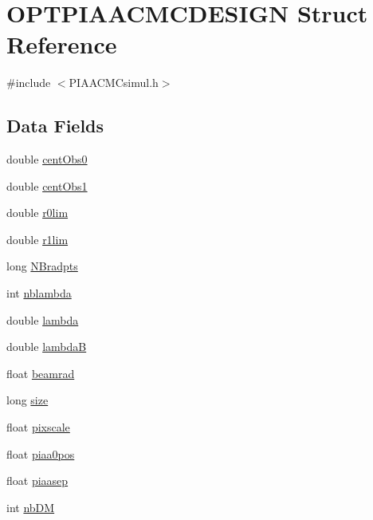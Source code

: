 \hypertarget{structOPTPIAACMCDESIGN}{\section{O\+P\+T\+P\+I\+A\+A\+C\+M\+C\+D\+E\+S\+I\+G\+N Struct Reference}
\label{structOPTPIAACMCDESIGN}
}


{\ttfamily \#include $<$P\+I\+A\+A\+C\+M\+Csimul.\+h$>$}

\subsection*{Data Fields}
\begin{DoxyCompactItemize}
\item 
double \hyperlink{structOPTPIAACMCDESIGN_ad8031116439ad3b191f5fb6e6cfe0070}{cent\+Obs0}
\item 
double \hyperlink{structOPTPIAACMCDESIGN_a4d8d03c42ff2aec6c5b974d80d086a5e}{cent\+Obs1}
\item 
double \hyperlink{structOPTPIAACMCDESIGN_a0f039998bd513a4a91d5d144ba51001c}{r0lim}
\item 
double \hyperlink{structOPTPIAACMCDESIGN_a4842ab89cd721c1c83af3d4b728ffcf6}{r1lim}
\item 
long \hyperlink{structOPTPIAACMCDESIGN_a8389b7bc4b26b28b6b95eed878237000}{N\+Bradpts}
\item 
int \hyperlink{structOPTPIAACMCDESIGN_a02144a94930448a77754dee947a8600e}{nblambda}
\item 
double \hyperlink{structOPTPIAACMCDESIGN_a64a6567f44c2102f913d378930c2c5f7}{lambda}
\item 
double \hyperlink{structOPTPIAACMCDESIGN_ac4a10cbfc3935db33fb2f3c5612fe0ef}{lambda\+B}
\item 
float \hyperlink{structOPTPIAACMCDESIGN_ac90bf363beaa0d44651ae1c69268de15}{beamrad}
\item 
long \hyperlink{structOPTPIAACMCDESIGN_a9a77cc42ff9de1dbd1d484e7020da6eb}{size}
\item 
float \hyperlink{structOPTPIAACMCDESIGN_a41ee229fbf9d612f8650c127b7ed022b}{pixscale}
\item 
float \hyperlink{structOPTPIAACMCDESIGN_a3b878597ef430b432a169fbd1138112a}{piaa0pos}
\item 
float \hyperlink{structOPTPIAACMCDESIGN_ab9b00e2fc69b7a0b11354d5cdf718635}{piaasep}
\item 
int \hyperlink{structOPTPIAACMCDESIGN_abcbc2dfd1fde61c341f2689b1ed810dd}{nb\+D\+M}

\end{DoxyCompactItemize}
